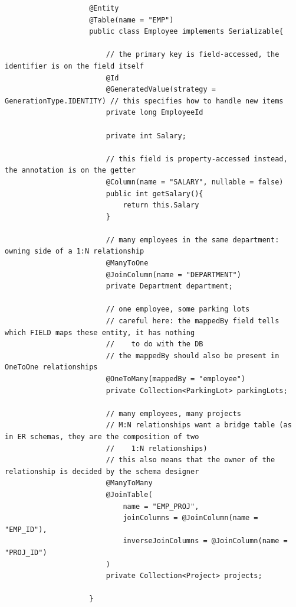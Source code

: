 \documentclass{article}
\begin{document}
				\begin{verbatim}
					@Entity
					@Table(name = "EMP")
					public class Employee implements Serializable{
						
					    // the primary key is field-accessed, the identifier is on the field itself
					    @Id
					    @GeneratedValue(strategy = GenerationType.IDENTITY) // this specifies how to handle new items
					    private long EmployeeId
					
					    private int Salary;
					    
					    // this field is property-accessed instead, the annotation is on the getter
					    @Column(name = "SALARY", nullable = false)
					    public int getSalary(){
					        return this.Salary
					    }
					    
					    // many employees in the same department: owning side of a 1:N relationship
					    @ManyToOne
					    @JoinColumn(name = "DEPARTMENT")
					    private Department department;

					    // one employee, some parking lots
					    // careful here: the mappedBy field tells which FIELD maps these entity, it has nothing 
					    //    to do with the DB
					    // the mappedBy should also be present in OneToOne relationships
					    @OneToMany(mappedBy = "employee")
					    private Collection<ParkingLot> parkingLots;

					    // many employees, many projects
					    // M:N relationships want a bridge table (as in ER schemas, they are the composition of two 
					    //    1:N relationships)
					    // this also means that the owner of the relationship is decided by the schema designer
					    @ManyToMany
					    @JoinTable(
					        name = "EMP_PROJ",
					        joinColumns = @JoinColumn(name = "EMP_ID"),
					        inverseJoinColumns = @JoinColumn(name = "PROJ_ID")
					    )
					    private Collection<Project> projects;

					}
				\end{verbatim}
\end{document}
